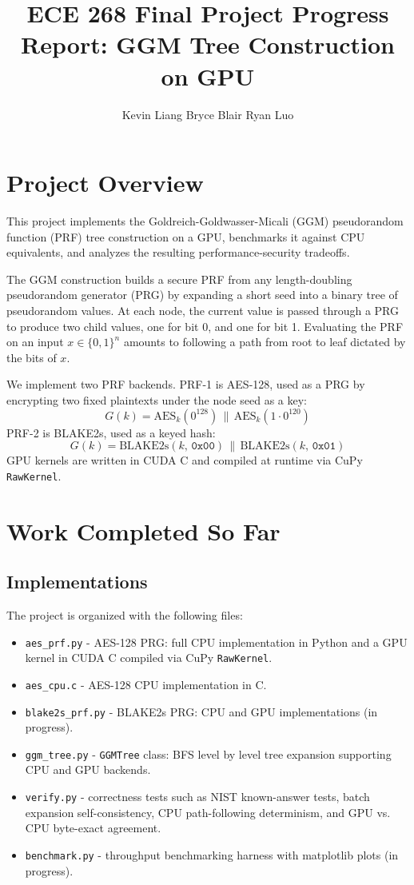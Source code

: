 \documentclass[12pt]{article}
\title{ECE 268 Final Project Progress Report: GGM Tree Construction on GPU}
\author{Kevin Liang \quad Bryce Blair \quad Ryan Luo}
\date{}
\begin{document}
\maketitle

\section{Project Overview}

This project implements the Goldreich-Goldwasser-Micali (GGM) pseudorandom function (PRF) tree construction on a GPU, benchmarks it against CPU equivalents, and analyzes the resulting performance-security tradeoffs.

The GGM construction builds a secure PRF from any length-doubling pseudorandom generator (PRG) by expanding a short seed into a binary tree of pseudorandom values. At each node, the current value is passed through a PRG to produce two child values, one for bit 0, and one for bit 1. Evaluating the PRF on an input $x \in \{0,1\}^n$ amounts to following a path from root to leaf dictated by the bits of $x$.

We implement two PRF backends. PRF-1 is AES-128, used as a PRG by encrypting two fixed plaintexts under the node seed as a key:
\[
G(k) = \text{AES}_k(0^{128}) \,\|\, \text{AES}_k(1 \cdot 0^{120})
\]
PRF-2 is BLAKE2s, used as a keyed hash:
\[
G(k) = \text{BLAKE2s}(k,\, \texttt{0x00}) \,\|\, \text{BLAKE2s}(k,\, \texttt{0x01})
\]
GPU kernels are written in CUDA C and compiled at runtime via CuPy \texttt{RawKernel}.

\section{Work Completed So Far}

\subsection{Implementations}

The project is organized with the following files:
\begin{itemize}
    \item \texttt{aes\_prf.py} - AES-128 PRG: full CPU implementation in Python and a GPU kernel in CUDA C compiled via CuPy \texttt{RawKernel}.
    \item \texttt{aes\_cpu.c} - AES-128 CPU implementation in C.
    \item \texttt{blake2s\_prf.py} - BLAKE2s PRG: CPU and GPU implementations (in progress).
    \item \texttt{ggm\_tree.py} - \texttt{GGMTree} class: BFS level by level tree expansion supporting CPU and GPU backends.
    \item \texttt{verify.py} - correctness tests such as NIST known-answer tests, batch expansion self-consistency, CPU path-following determinism, and GPU vs. CPU byte-exact agreement.
    \item \texttt{benchmark.py} - throughput benchmarking harness with matplotlib plots (in progress).
\end{itemize}
\end{document}
